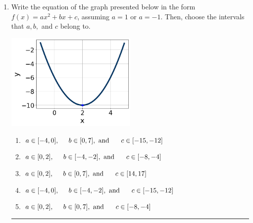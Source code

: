 \documentclass[14pt]{extbook}
\newcommand{\litem}[1]{\item#1\hspace*{-1cm}\rule{\textwidth}{0.4pt}}
\begin{document}
\begin{enumerate}
\litem{
Write the equation of the graph presented below in the form $f(x)=ax^2+bx+c$, assuming  $a=1$ or $a=-1$. Then, choose the intervals that $a, b,$ and $c$ belong to.
\begin{center}
    \includegraphics[width=0.5\textwidth]{../Figures/quadraticGraphToEquationB.png}
\end{center}
\begin{enumerate}[label=\Alph*.]
\item \( a \in [-4, 0], \hspace*{5mm} b \in [0, 7], \text{ and } \hspace*{5mm} c \in [-15, -12] \)
\item \( a \in [0, 2], \hspace*{5mm} b \in [-4, -2], \text{ and } \hspace*{5mm} c \in [-8, -4] \)
\item \( a \in [0, 2], \hspace*{5mm} b \in [0, 7], \text{ and } \hspace*{5mm} c \in [14, 17] \)
\item \( a \in [-4, 0], \hspace*{5mm} b \in [-4, -2], \text{ and } \hspace*{5mm} c \in [-15, -12] \)
\item \( a \in [0, 2], \hspace*{5mm} b \in [0, 7], \text{ and } \hspace*{5mm} c \in [-8, -4] \)


\end{enumerate}}
\end{enumerate}
\end{document}

